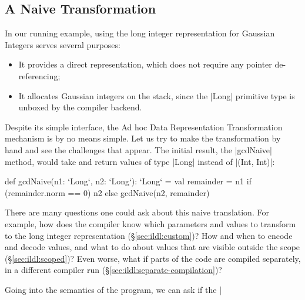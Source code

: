 
\subsection{A Naive Transformation}


In our running example, using the long integer representation for Gaussian Integers serves several purposes:

\begin{itemize}
  \item It provides a direct representation, which does not require any pointer de-referencing;
  \item It allocates Gaussian integers on the stack, since the |Long| primitive type is unboxed by the compiler backend.
\end{itemize}

Despite its simple interface, the Ad hoc Data Representation Transformation mechanism is by no means simple. Let us try to make the transformation by hand and see the challenges that appear. The initial result, the |gcdNaive| method, would take and return values of type |Long| instead of |(Int, Int)|:

\begin{lstlisting-nobreak}
def gcdNaive(n1: `Long`, n2: `Long`): `Long` = {
  val remainder = n1 %
  if (remainder.norm == 0) n2 else gcdNaive(n2, remainder)
}
\end{lstlisting-nobreak}

There are many questions one could ask about this naive translation. For example, how does the compiler know which parameters and values to transform to the long integer representation (\S\ref{sec:ildl:custom})? How and when to encode and decode values, and what to do about values that are visible outside the scope (\S\ref{sec:ildl:scoped})? Even worse, what if parts of the code are compiled separately, in a different compiler run (\S\ref{sec:ildl:separate-compilation})?

Going into the semantics of the program, we can ask if the |%

